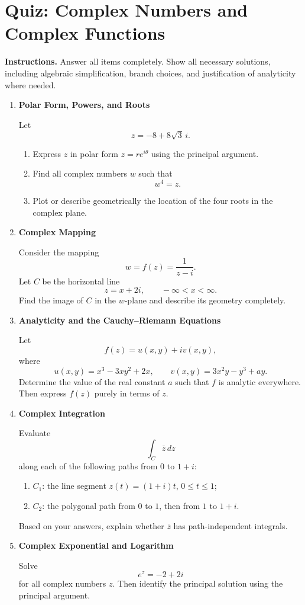 \section*{Quiz: Complex Numbers and Complex Functions}

\textbf{Instructions.} Answer all items completely. Show all necessary solutions, including algebraic simplification, branch choices, and justification of analyticity where needed.

\begin{enumerate}
    \item \textbf{Polar Form, Powers, and Roots}

    Let
    \[
        z=-8+8\sqrt{3}\,i.
    \]
    \begin{enumerate}
        \item Express $z$ in polar form $z=re^{i\theta}$ using the principal argument.
        \item Find all complex numbers $w$ such that
        \[
            w^4=z.
        \]
        \item Plot or describe geometrically the location of the four roots in the complex plane.
    \end{enumerate}

    \item \textbf{Complex Mapping}

    Consider the mapping
    \[
        w=f(z)=\frac{1}{z-i}.
    \]
    Let $C$ be the horizontal line
    \[
        z=x+2i, \qquad -\infty < x < \infty.
    \]
    Find the image of $C$ in the $w$-plane and describe its geometry completely.

    \item \textbf{Analyticity and the Cauchy--Riemann Equations}

    Let
    \[
        f(z)=u(x,y)+iv(x,y),
    \]
    where
    \[
        u(x,y)=x^3-3xy^2+2x,
        \qquad
        v(x,y)=3x^2y-y^3+ay.
    \]
    Determine the value of the real constant $a$ such that $f$ is analytic everywhere. Then express $f(z)$ purely in terms of $z$.

    \item \textbf{Complex Integration}

    Evaluate
    \[
        \int_C \overline{z}\,dz
    \]
    along each of the following paths from $0$ to $1+i$:
    \begin{enumerate}
        \item $C_1$: the line segment $z(t)=(1+i)t$, $0\le t\le 1$;
        \item $C_2$: the polygonal path from $0$ to $1$, then from $1$ to $1+i$.
    \end{enumerate}
    Based on your answers, explain whether $\overline{z}$ has path-independent integrals.

    \item \textbf{Complex Exponential and Logarithm}

    Solve
    \[
        e^z=-2+2i
    \]
    for all complex numbers $z$. Then identify the principal solution using the principal argument.
\end{enumerate}
